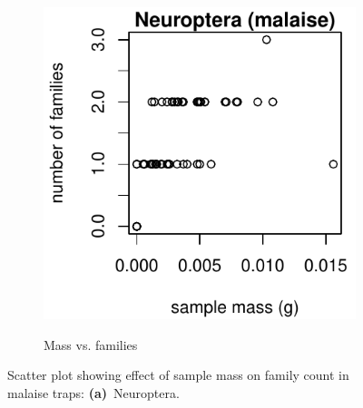 \documentclass[10pt,letterpaper,twocolumn]{article}
\begin{document}
\begin{figure}[h]
	\centering
	\begin{subfigure}[b]{0.15\textwidth}
		\caption{Mass vs. families}
		\includegraphics[width=\textwidth]{plots/mass-vs-count/scatter/2015_malaise_Neuroptera_mass-vs-count.pdf}
		\label{fig:malaise_neuroptera_scatter}
	\end{subfigure}
	\caption{Scatter plot showing effect of sample mass on family count in malaise traps: \textbf{(a)}~Neuroptera.}
	\label{fig:malaise_incomplete}
	\smallskip
	\nointerlineskip
	\hrulefill
\end{figure}

\end{document}

